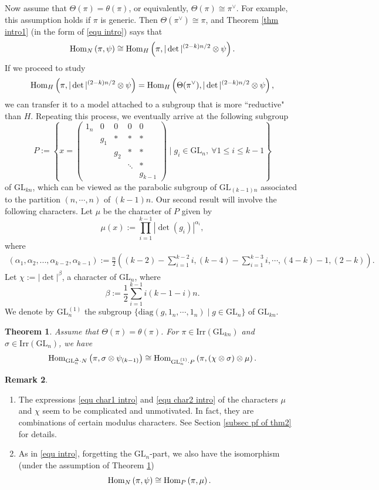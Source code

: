 \documentclass[11pt,reqno]{amsart}
\renewcommand{\1}{{\mathbf{1}}} \newcommand{\sB}{{\mathscr{B}}}
\newcommand{\diag}{{\mathrm{diag}}}\renewcommand{\d}{{\mathrm{d}}}
\newcommand{\GL}{{\mathrm{GL}}}\newcommand{\G}{{\mathrm{G}}}
\newcommand{\Irr}{{\mathrm{Irr}}} \newcommand{\cInd}{{\mathrm{c-Ind}}}
\theoremstyle{plain}
\newtheorem{thm}{Theorem}[section] \newtheorem{cor}[thm]{Corollary}
\theoremstyle{definition}
\newtheorem{rem}[thm]{Remark} \newtheorem{fact}[thm]{Fact}
\numberwithin{equation}{section}
\begin{document}
Now assume that $\Theta(\pi)=\theta(\pi)$, or equivalently, $\Theta(\pi)\cong\pi^\vee$. For example, this assumption holds if
$\pi$ is generic. Then $\Theta(\pi^\vee)\cong\pi$, and Theorem \ref{thm intro1} (in the form of \eqref{equ intro}) says that $${\mathrm{Hom}}_{N}\left(\pi,\psi\right)\cong
{\mathrm{Hom}}_{H}\left(\pi,
|\det|^{(2-k)n/2}\otimes\psi\right).$$ If we proceed to study  $${\mathrm{Hom}}_{H}\left(\pi,
|\det|^{(2-k)n/2}\otimes\psi\right)={\mathrm{Hom}}_{H}\left(\Theta(\pi^\vee),
|\det|^{(2-k)n/2}\otimes\psi\right),$$ we can transfer it to a model attached to a subgroup that is more ``reductive" than $H$. Repeating this process, we eventually arrive at the following subgroup
$$P:=\left\{x=\begin{pmatrix}1_n&0&0&0&0\\ &g_1&*&*&*\\ &&g_2&*&*\\ &&&\ddots&*\\ &&&&g_{k-1} \end{pmatrix}\mid g_i\in\GL_n,\ \forall1\leq i\leq k-1\right\}$$ of $\GL_{kn}$, which can be viewed as the parabolic subgroup of $\GL_{(k-1)n}$ associated to the partition $(n,\cdots,n)$ of $(k-1)n$. Our second result will involve the following characters. Let $\mu$ be the character of $P$ given by
$$\mu(x):=\prod_{i=1}^{k-1}|\det(g_i)|^{\alpha_i},$$ where
\begin{equation}\label{equ char1 intro}\begin{aligned}\left(\alpha_1,\alpha_2,...,\alpha_{k-2},\alpha_{k-1}\right):=\frac{n}{2}\left((k-2)-\sum_{i=1}^{k-2}i,(k-4)-\sum_{i=1}^{k-3}i,\cdots,(4-k)-1,(2-k)\right).\end{aligned}\end{equation}
Let $\chi:=|\det|^\beta$, a character of $\GL_n$, where
\begin{equation}\label{equ char2 intro}\beta:=\frac{1}{2}\sum_{i=1}^{k-1}i(k-1-i)n.\end{equation}
We denote by $\GL_n^{(1)}$ the subgroup $\{\diag(g,1_n,\cdots,1_n)\mid g\in\GL_n\}$ of $\GL_{kn}$.

\begin{thm}\label{thm intro2}
Assume that $\Theta(\pi)=\theta(\pi)$. For $\pi\in\Irr(\GL_{kn})$ and $\sigma\in\Irr(\GL_n)$, we have
$$\Hom_{\GL_n^{\Delta}\cdot N}\left(\pi,\sigma\otimes\psi_{(k-1)}\right)\cong\Hom_{\GL_n^{(1)}\cdot P}\left(\pi,(\chi\otimes\sigma)\otimes\mu\right).$$
\end{thm}

\begin{rem}
\begin{enumerate}
\item The expressions \eqref{equ char1 intro} and \eqref{equ char2 intro}  of the characters $\mu$ and $\chi$ seem to be complicated and unmotivated. In fact, they are combinations of certain modulus characters. See Section \ref{subsec pf of thm2}  for details.
\item As in \eqref{equ intro}, forgetting the $\GL_n$-part, we also have the isomorphism (under the assumption of Theorem \ref{thm intro2})
$${\mathrm{Hom}}_{N}\left(\pi,\psi\right)\cong{\mathrm{Hom}}_{P}\left(\pi,\mu\right).$$
\end{enumerate}
\end{rem}
\end{document}

